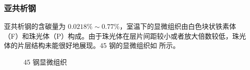     \subsubsection{亚共析钢}
    亚共析钢的含碳量为 $0.0218\%\sim 0.77\%$，室温下的显微组织由白色块状铁素体（F）和珠光体（P）构成。由于珠光体在层片间距较小或者放大倍数较低，珠光体的片层结构未能很好地展现。45 钢的显微组织如 所示。
    \begin{figure}[!ht]
        \hspace{20pt}
        \hspace{20pt}
        \caption{45 钢显微组织\label{fig:n2}}
    \end{figure}

